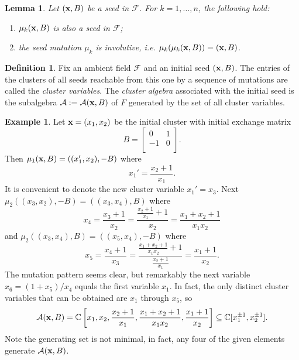 \documentclass{amsart}
\newtheorem{lemma}[theorem]{Lemma}
\theoremstyle{definition}
\newtheorem{definition}[theorem]{Definition}
\newtheorem{example}[theorem]{Example}
\theoremstyle{remark}
\numberwithin{equation}{section}
\newcommand{\cA}{{\mathcal{A}}}
\newcommand{\cF}{{\mathcal{F}}}
\newcommand{\x}{{\bf x}}
\newcommand{\bx}{{\bf x}}
\newcommand{\CC}{{\mathbb{C}}}
\begin{document}
	\begin{lemma} \label{lem:mutate}
	Let $(\x,B)$ be a seed in $\cF$.  For $k=1,\ldots, n$, the following hold:
	\begin{enumerate}
		\item $\mu_k(\x,B)$ is also a seed in $\cF$;
		\item the seed mutation $\mu_k$ is involutive, i.e. $\mu_k(\mu_k(\x,B)) = (\x,B)$.
	\end{enumerate}
	\end{lemma}
	
	\begin{definition}
		Fix an ambient field $\cF$ and an initial seed $(\bx, B)$.  The entries of the clusters of all seeds reachable from this one by a sequence of mutations are called the \emph{cluster variables}.  The \emph{cluster algebra} associated with the initial seed is the subalgebra $\cA:=\cA(\bx,B)$ of $F$ generated by the set of all cluster variables.
	\end{definition}
	
  \begin{example}\label{example:type A2}
		Let $\x = (x_1,x_2)$ be the initial cluster with initial exchange matrix
		\begin{displaymath}
			B = \left[ \begin{array}{cc}
			0 & 1 \\
			-1 & 0 \\
			\end{array}
			\right].
		\end{displaymath}
		Then $\mu_1(\x,B) = ((x_1',x_2), -B)$ where
		\begin{displaymath}
			x_1' = \frac{x_2+1}{x_1}.
		\end{displaymath}
		It is convenient to denote the new cluster variable $x_1'=x_3$.  Next $\mu_2((x_3,x_2),-B) = ((x_3,x_4),B)$ where
		\begin{displaymath}
			x_4 = \frac{x_3+1}{x_2} = \frac{\frac{x_2+1}{x_1}+1}{x_2} = \frac{x_1 + x_2 + 1}{x_1x_2}
		\end{displaymath}
		and  $\mu_2((x_3,x_4),B) = ((x_5,x_4),-B)$ where
		\begin{displaymath}
			x_5 = \frac{x_4+1}{x_3} = \frac{\frac{x_1 + x_2 + 1}{x_1x_2}+1}{\frac{x_2+1}{x_1}} = \frac{x_1+1}{x_2}.
		\end{displaymath}
		The mutation pattern seems clear, but remarkably the next variable $x_6 = (1+x_5)/x_4$ equals the first variable $x_1$.  In fact, the only distinct cluster variables that can be obtained are $x_1$ through $x_5$, so
		\begin{displaymath}
			\cA(\x,B) = \CC\left[x_1,x_2,\frac{x_2+1}{x_1},\frac{x_1 + x_2 + 1}{x_1x_2},\frac{x_1+1}{x_2}\right] \subseteq \CC[x_1^{\pm1},x_2^{\pm1}].
		\end{displaymath}
		Note the generating set is not minimal, in fact, any four of the given elements generate $\cA(\x,B)$.
  \end{example}
	
\end{document}
